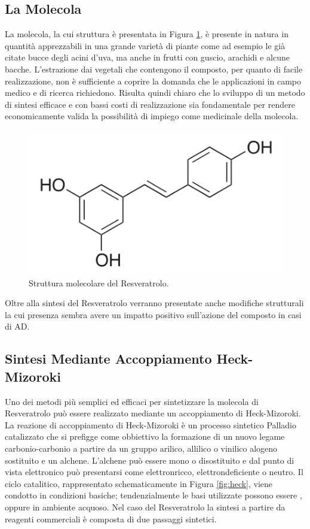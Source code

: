 \documentclass[a4paper, 12pt]{article}
\begin{document}
\subsection{La Molecola}
La molecola, la cui struttura è presentata in Figura \ref{fig:resveratrolo}, è presente in natura in quantità apprezzabili in una grande varietà di piante come ad esempio le già citate bucce degli acini d'uva, ma anche in frutti con guscio, arachidi e alcune bacche. L'estrazione dai vegetali che contengono il composto, per quanto di facile realizzazione, non è sufficiente a coprire la domanda che le applicazioni in campo medico e di ricerca richiedono. Risulta quindi chiaro che lo sviluppo di un metodo di sintesi efficace e con bassi costi di realizzazione sia fondamentale per rendere economicamente valida la possibilità di impiego come medicinale della molecola.
\begin{figure}[H]
	\centering
	\includegraphics[width=.5\linewidth]{immagini/resveratrolo.png}
	\caption{Struttura molecolare del Resveratrolo.}
	\label{fig:resveratrolo}
\end{figure}
Oltre alla sintesi del Resveratrolo verranno presentate anche modifiche strutturali la cui presenza sembra avere un impatto positivo sull'azione del composto in casi di AD.

\subsection{Sintesi Mediante Accoppiamento Heck-Mizoroki}
Uno dei metodi più semplici ed efficaci per sintetizzare la molecola di Resveratrolo può essere realizzato mediante un accoppiamento di Heck-Mizoroki.
La reazione di accoppiamento di Heck-Mizoroki è un processo sintetico Palladio catalizzato che si prefigge come obbiettivo la formazione di un nuovo legame carbonio-carbonio a partire da un gruppo arilico, allilico o vinilico alogeno sostituito e un alchene. L'alchene può essere mono o disostituito e dal punto di vista elettronico può presentarsi come elettronricco, elettrondeficiente o neutro. Il ciclo catalitico, rappresentato schematicamente in Figura \ref{fig:heck}, viene condotto in condizioni basiche; tendenzialmente le basi utilizzate possono essere ,  oppure  in ambiente acquoso. \cite{clayden_organic_2012}
Nel caso del Resveratrolo la sintesi a partire da reagenti commerciali è composta di due passaggi sintetici.
\end{document}
